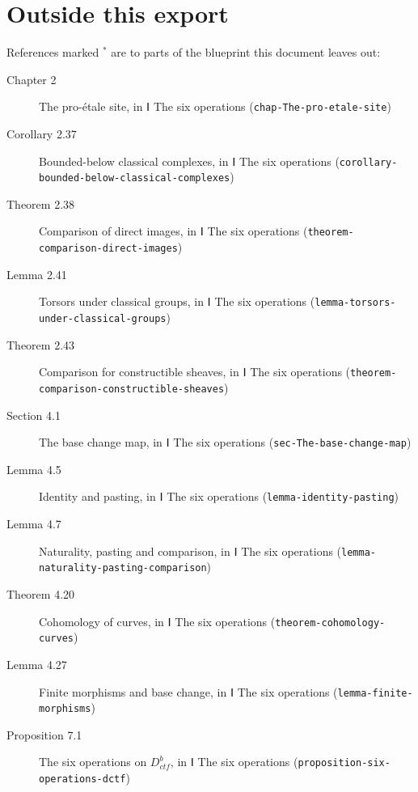 \documentclass[11pt]{article}
\newcommand{\bpslug}[1]{\texttt{#1}}
\providecommand{\Dctf}{}\renewcommand{\Dctf}{D^b_{ctf}}
\begin{document}
\section*{Outside this export}
References marked \ensuremath{{}^\ast} are to parts of the blueprint this document leaves out:
\begin{description}
\item[Chapter 2] The pro-étale site, in Ⅰ The six operations (\bpslug{chap-{}\allowbreak{}The-{}\allowbreak{}pro-{}\allowbreak{}etale-{}\allowbreak{}site})
\item[Corollary 2.37] Bounded-below classical complexes, in Ⅰ The six operations (\bpslug{corollary-{}\allowbreak{}bounded-{}\allowbreak{}below-{}\allowbreak{}classical-{}\allowbreak{}complexes})
\item[Theorem 2.38] Comparison of direct images, in Ⅰ The six operations (\bpslug{theorem-{}\allowbreak{}comparison-{}\allowbreak{}direct-{}\allowbreak{}images})
\item[Lemma 2.41] Torsors under classical groups, in Ⅰ The six operations (\bpslug{lemma-{}\allowbreak{}torsors-{}\allowbreak{}under-{}\allowbreak{}classical-{}\allowbreak{}groups})
\item[Theorem 2.43] Comparison for constructible sheaves, in Ⅰ The six operations (\bpslug{theorem-{}\allowbreak{}comparison-{}\allowbreak{}constructible-{}\allowbreak{}sheaves})
\item[Section 4.1] The base change map, in Ⅰ The six operations (\bpslug{sec-{}\allowbreak{}The-{}\allowbreak{}base-{}\allowbreak{}change-{}\allowbreak{}map})
\item[Lemma 4.5] Identity and pasting, in Ⅰ The six operations (\bpslug{lemma-{}\allowbreak{}identity-{}\allowbreak{}pasting})
\item[Lemma 4.7] Naturality, pasting and comparison, in Ⅰ The six operations (\bpslug{lemma-{}\allowbreak{}naturality-{}\allowbreak{}pasting-{}\allowbreak{}comparison})
\item[Theorem 4.20] Cohomology of curves, in Ⅰ The six operations (\bpslug{theorem-{}\allowbreak{}cohomology-{}\allowbreak{}curves})
\item[Lemma 4.27] Finite morphisms and base change, in Ⅰ The six operations (\bpslug{lemma-{}\allowbreak{}finite-{}\allowbreak{}morphisms})
\item[Proposition 7.1] The six operations on $\Dctf$, in Ⅰ The six operations (\bpslug{proposition-{}\allowbreak{}six-{}\allowbreak{}operations-{}\allowbreak{}dctf})

\end{description}
\end{document}
